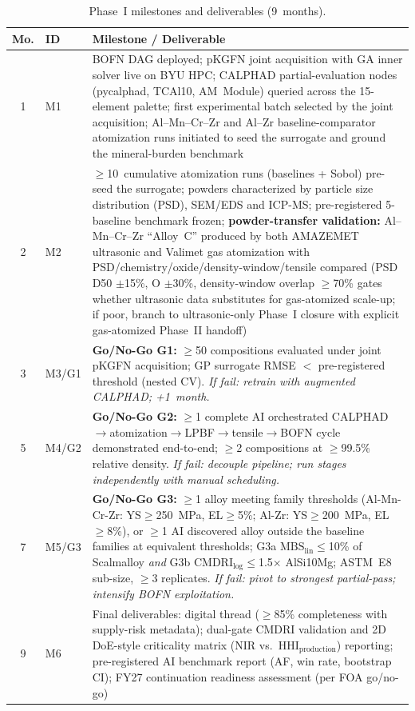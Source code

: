 \documentclass[11pt,letterpaper]{article}
\begin{document}
\begin{table}[H]
\centering\footnotesize
\caption{Phase~I milestones and deliverables (9~months).}
\label{tab:milestones}
\setlength{\tabcolsep}{3pt}
\begin{tabularx}{\textwidth}{clX}
\toprule
\textbf{Mo.} & \textbf{ID} & \textbf{Milestone / Deliverable} \\
\midrule
1 & M1 & BOFN DAG deployed; pKGFN joint acquisition with GA inner solver live on BYU HPC; CALPHAD partial-evaluation nodes (pycalphad, TCAl10, AM~Module) queried across the 15-element palette; first experimental batch selected by the joint acquisition; Al--Mn--Cr--Zr and Al--Zr baseline-comparator atomization runs initiated to seed the surrogate and ground the mineral-burden benchmark \\
2 & M2 & $\geq$10~cumulative atomization runs (baselines + Sobol) pre-seed the surrogate; powders characterized by particle size distribution (PSD), SEM/EDS and ICP-MS; pre-registered 5-baseline benchmark frozen; \textbf{powder-transfer validation:} Al--Mn--Cr--Zr ``Alloy~C'' produced by both AMAZEMET ultrasonic and Valimet gas atomization with PSD/chemistry/oxide/density-window/tensile compared (PSD D50 $\pm$15\%, O $\pm$30\%, density-window overlap $\geq$70\% gates whether ultrasonic data substitutes for gas-atomized scale-up; if poor, branch to ultrasonic-only Phase~I closure with explicit gas-atomized Phase~II handoff) \\
3 & M3/G1 & \textbf{Go/No-Go G1:} $\geq$50 compositions evaluated under joint pKGFN acquisition; GP surrogate RMSE $<$ pre-registered threshold (nested CV). \textit{If fail: retrain with augmented CALPHAD; +1~month.} \\
5 & M4/G2 & \textbf{Go/No-Go G2:} $\geq$1 complete AI orchestrated CALPHAD$\to$atomization$\to$LPBF$\to$tensile$\to$BOFN cycle demonstrated end-to-end; $\geq$2 compositions at $\geq$99.5\% relative density. \textit{If fail: decouple pipeline; run stages independently with manual scheduling.} \\
7 & M5/G3 & \textbf{Go/No-Go G3:} $\geq$1 alloy meeting family thresholds (Al-Mn-Cr-Zr: YS$\geq$250~MPa, EL$\geq$5\%; Al-Zr: YS$\geq$200~MPa, EL$\geq$8\%), or $\geq$1 AI discovered alloy outside the baseline families at equivalent thresholds; G3a $\mathrm{MBS}_\text{lin}\leq$10\% of Scalmalloy \emph{and} G3b $\mathrm{CMDRI}_\text{log}\leq$1.5$\times$ AlSi10Mg; ASTM~E8 sub-size, $\geq$3 replicates. \textit{If fail: pivot to strongest partial-pass; intensify BOFN exploitation.} \\
9 & M6 & Final deliverables: digital thread ($\geq$85\% completeness with supply-risk metadata); dual-gate CMDRI validation and 2D DoE-style criticality matrix (NIR vs.\ $\mathrm{HHI}_\text{production}$) reporting; pre-registered AI benchmark report (AF, win rate, bootstrap CI); FY27 continuation readiness assessment (per FOA go/no-go) \\
\bottomrule
\end{tabularx}
\end{table}
\end{document}
